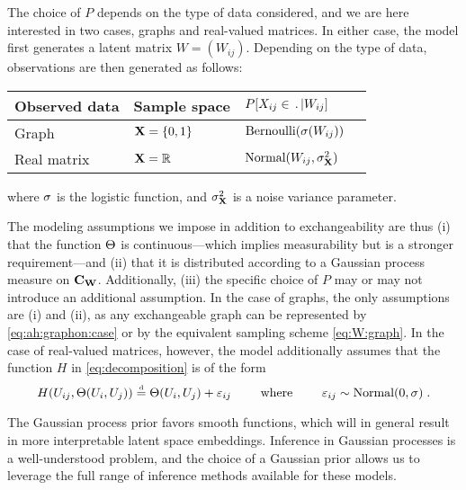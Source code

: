 The choice of $P$ depends on the type of data considered, and we are here interested in two cases, graphs and 
real-valued matrices.
In either case, the model first generates a latent matrix $W=(W_{ij})$. 
Depending on the type of data, observations are then generated as follows:
\begin{center}
  \begin{tabular}{llll} 
    Observed data & Sample space & $P[X_{ij}\in\,.\,|W_{ij}]$  \\
    \midrule
    Graph & $\mathbf{X}=\lbrace{0,1}\rbrace$  & $\mbox{\rm Bernoulli}(\sigma(W_{ij}))$
    \vspace{2pt}\\
    Real matrix & $\mathbf{X}=\mathbb{R}$  & $\mbox{Normal}(W_{ij},\sigma_{\mathbf{X}}^2)$\\
  \end{tabular}
\end{center}
where $\sigma$ is the logistic function, and $\sigma_{\mathbf{X}}^2$ is a noise variance parameter.

The modeling assumptions we impose in addition to exchangeability are thus (i) that the function $\Theta$ is continuous---which implies measurability but is a stronger requirement---and (ii) that it is distributed according to a Gaussian process measure on $\mathbf{C}_{\mathbf{W}}$.
Additionally, (iii) the specific choice of $P$ may or may not introduce an additional assumption.
In the case of graphs, the only assumptions are (i) and (ii), 
as any exchangeable graph can be represented by \eqref{eq:ah:graphon:case} or by the equivalent sampling scheme \eqref{eq:W:graph}.
In the case of real-valued matrices, however, the model additionally assumes that the function 
$H$ in \eqref{eq:decomposition} is of the form
\begin{equation}
  H(U_{ij},\Theta(U_i,U_j))\stackrel{\mbox{\tiny d}}{=} \Theta(U_i,U_j)+\varepsilon_{ij} \qquad\text{ where }\qquad \varepsilon_{ij}\sim\mbox{Normal}(0,\sigma)\;.
\end{equation}

The Gaussian process prior favors smooth functions, which will in general result in more interpretable latent space embeddings.
Inference in Gaussian processes is a well-understood problem, and the choice of a Gaussian prior allows us to leverage the 
full range of inference methods available for these models.




